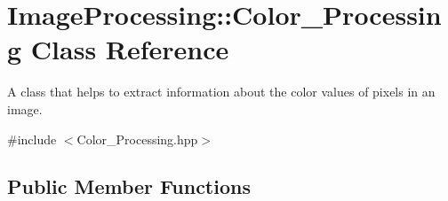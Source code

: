 \hypertarget{class_image_processing_1_1_color___processing}{}\section{Image\+Processing\+:\+:Color\+\_\+\+Processing Class Reference}
\label{class_image_processing_1_1_color___processing}


A class that helps to extract information about the color values of pixels in an image.  




{\ttfamily \#include $<$Color\+\_\+\+Processing.\+hpp$>$}

\subsection*{Public Member Functions}
